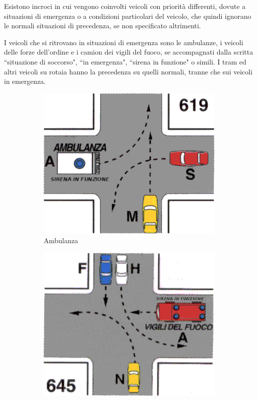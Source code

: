Esistono incroci in cui vengono coinvolti veicoli con priorità differenti, dovute a situazioni di emergenza o a condizioni particolari del veicolo, che quindi ignorano le normali situazioni di precedenza, se non specificato altrimenti.

I veicoli che si ritrovano in situazioni di emergenza sono le ambulanze, i veicoli delle forze dell'ordine e i camion dei vigili del fuoco, se accompagnati dalla scritta ``situazione di soccorso", ``in emergenza", ``sirena in funzione" o simili. I tram ed altri veicoli su rotaia hanno la precedenza su quelli normali, tranne che sui veicoli in emergenza.


\begin{figure}[htbp!]
	\centering
	\begin{subfigure}{.3\textwidth}
		\includegraphics[width=\textwidth]{./images/ambulance}
		\caption{Ambulanza}
		\label{fig:amb}
	\end{subfigure}
	\begin{subfigure}{.3\textwidth}
		\includegraphics[width=\textwidth]{./images/fire}

\end{subfigure}
\end{figure}

